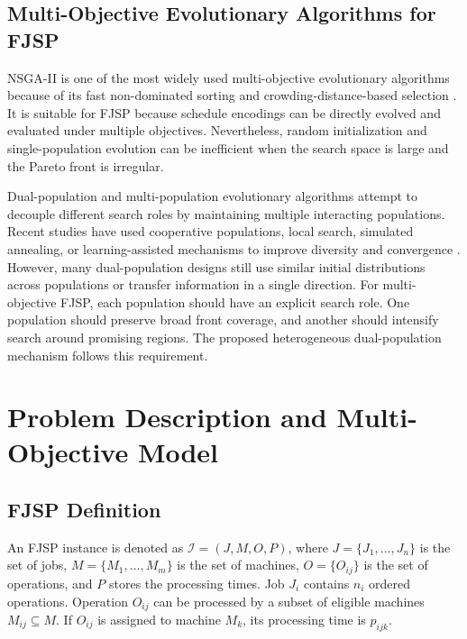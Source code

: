 \documentclass[pdflatex,iicol,Numbered,sn-basic]{sn-jnl}
\begin{document}
\subsection{Multi-Objective Evolutionary Algorithms for FJSP}\label{subsec:moea_lit}

NSGA-II is one of the most widely used multi-objective evolutionary algorithms because of its fast non-dominated sorting and crowding-distance-based selection \cite{deb2002fast}. It is suitable for FJSP because schedule encodings can be directly evolved and evaluated under multiple objectives.
Nevertheless, random initialization and single-population evolution can be inefficient when the search space is large and the Pareto front is irregular.

Dual-population and multi-population evolutionary algorithms attempt to decouple different search roles by maintaining multiple interacting populations. Recent studies have used cooperative populations, local search, simulated annealing, or learning-assisted mechanisms to improve diversity and convergence \cite{guo2025enhanced,zhang2024cooperative}.
However, many dual-population designs still use similar initial distributions across populations or transfer information in a single direction.
For multi-objective FJSP, each population should have an explicit search role. One population should preserve broad front coverage, and another should intensify search around promising regions. The proposed heterogeneous dual-population mechanism follows this requirement.

\section{Problem Description and Multi-Objective Model}\label{sec:problem}

\subsection{FJSP Definition}\label{subsec:problem_def}

An FJSP instance is denoted as $\mathcal{I}=(J,M,O,P)$, where $J=\{J_1,\ldots,J_n\}$ is the set of jobs, $M=\{M_1,\ldots,M_m\}$ is the set of machines, $O=\{O_{ij}\}$ is the set of operations, and $P$ stores the processing times. Job $J_i$ contains $n_i$ ordered operations.
Operation $O_{ij}$ can be processed by a subset of eligible machines $M_{ij}\subseteq M$. If $O_{ij}$ is assigned to machine $M_k$, its processing time is $p_{ijk}$.
\end{document}
